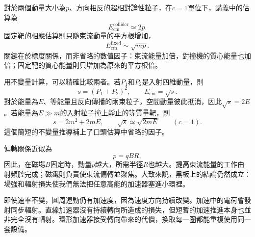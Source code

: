 對於兩個動量大小為\(p\)、方向相反的超相對論性粒子，在\(c=1\)單位下，講義中的估算為
\begin{equation}
E_{\mathrm{cm}}^{\mathrm{collider}}\simeq 2p.
\end{equation}
固定靶的相應估算則只隨束流動量的平方根增加，
\begin{equation}
E_{\mathrm{cm}}^{\mathrm{fixed}}\sim \sqrt{mp}.
\end{equation}
關鍵在於標度關係，而非省略的數值因子：束流能量加倍，對撞機的質心能量也加倍；固定靶的質心能量則只增加為原來的平方根倍。

用不變量計算，可以精確比較兩者。若\(P_1\)和\(P_2\)是入射四維動量，則
\begin{equation}
s=(P_1+P_2)^2,
\qquad E_{\mathrm{cm}}=\sqrt{s}.
\end{equation}
對於能量為\(E\)、等能量且反向傳播的兩束粒子，空間動量彼此抵消，因此\(\sqrt{s}=2E\)。若能量為\(E\gg m\)的入射粒子撞上靜止的等質量靶，則
\begin{equation}
s=2m^2+2mE,
\qquad
\sqrt{s}\simeq \sqrt{2mE}
\qquad (c=1).
\end{equation}
這個簡短的不變量推導補上了口頭估算中省略的因子。

\begin{classroomqa}
\end{classroomqa}

偏轉關係近似為
\begin{equation}
p=qBR,
\end{equation}
因此，在磁場\(B\)固定時，動量\(p\)越大，所需半徑\(R\)也越大。提高束流能量的工作由射頻腔完成；磁鐵則負責使束流偏轉並聚焦。大致來說，黑板上的結論仍然成立：場強和輻射損失使我們無法把任意高能的加速器塞進小環裡。

即使速率不變，圓周運動仍有加速度，因為速度方向持續改變。加速中的電荷會發射同步輻射。直線加速器沒有持續轉向所造成的損失，但短暫的加速推進本身也並非完全沒有輻射。環形加速器接受轉向帶來的代價，換取每一圈都能重複使用同一套設備。

\begin{classroomqa}
\end{classroomqa}

